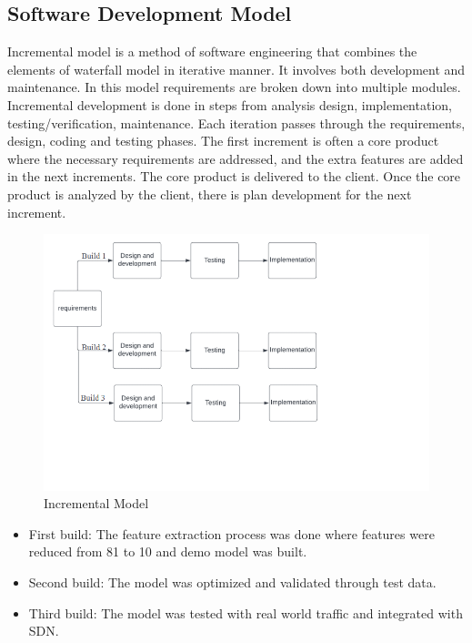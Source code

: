 \subsection{Software Development Model}
\vspace{-18pt}
Incremental model is a method of software engineering that combines the elements of waterfall model in iterative manner. It involves both development and maintenance. In this model requirements are broken down into multiple modules. Incremental development is done in steps from analysis design, implementation, testing/verification, maintenance. Each iteration passes through the requirements, design, coding and testing phases. The first increment is often a core product where the necessary requirements are addressed, and the extra features are added in the next increments. The core product is delivered to the client. Once the core product is analyzed by the client, there is plan development for the next increment.\par
\begin{figure}[tbh] %
	\begin{center}
		\includegraphics[width=6in]{images/sdlc1.png} 
		\caption{Incremental Model} %
		\label{Incremental Model} %
	\end{center}
\end{figure}
\begin{itemize}
	\item First build: The feature extraction process was done where features were reduced from 81 to 10 and demo model was built.
	\item Second build: The model was optimized and validated through test data.
	\item Third build: The model was tested with real world traffic and integrated with SDN.
\end{itemize}
